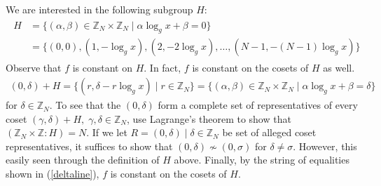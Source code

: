 \documentclass{../quantum.tex}
\begin{document}
We are interested in the following subgroup $H$:
\begin{gather*}
  \begin{split}
    H & = \{ (\alpha,\beta) \in \mathbb{Z}_N \times \mathbb{Z}_N \mid \alpha\log_g{x} + \beta = 0\} \\
      & = \{(0,0), (1, -\log_g{x}), (2, -2 \log_g{x}), \dots ,(N-1, -(N-1)\log_g{x}) \}
  \end{split}
\end{gather*}
Observe that $f$ is constant on $H$. In fact, $f$ is constant on the cosets of $H$ as well.
%
\begin{gather}
  \label{deltaline}
(0, \delta) + H = \{(r, \delta - r \log_g{x}) \mid r \in \mathbb{Z}_N\} = \{ (\alpha,\beta) \in \mathbb{Z}_N \times \mathbb{Z}_N \mid \alpha\log_g{x} + \beta = \delta\}
\end{gather}
for $\delta \in \mathbb{Z}_N$. To see that the $(0,\delta)$ form a complete set of representatives of every coset $(\gamma, \delta) + H, \; \gamma,\delta \in \mathbb{Z}_N$, use Lagrange's theorem to show that $(\mathbb{Z}_N \times \mathbb{Z} : H) = N$. If we let $R = {(0,\delta) \mid \delta \in \mathbb{Z}_N}$ be set of alleged coset representatives, it suffices to show that $(0,\delta) \not\sim (0,\sigma)$ for $\delta \neq \sigma$. However, this easily seen through the definition of $H$ above. Finally, by the string of equalities shown in (\ref{deltaline}), $f$ is constant on the cosets of $H$.
%
\end{document}
